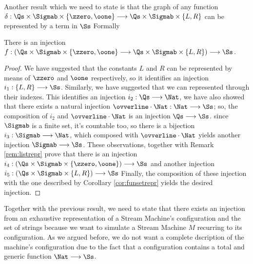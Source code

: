 \begin{conditional}{\notappendix}
  Another result which we need to state is that the graph of any function
  $\delta:\Qs \times \Sigmab \times
  \{\zzero, \oone\} \longrightarrow \Qs
  \times \Sigmab \times \{L,R\}$
  can be represented by a term in $\Ss$ Formally

  \begin{cor}
    \label{cor:deltarepr}
    There is an injection $f: (\Qs \times \Sigmab \times
    \{\zzero, \oone\} \longrightarrow \Qs
    \times \Sigmab \times \{L,R\}) \longrightarrow \Ss$.
  \end{cor}
  \begin{proof}
    We have suggested that the constants $L$ and $R$ can be represented by means of
    $\zzero$ and $\oone$ respectively, so it identifies an injection
    $i_1:\{L, R\} \longrightarrow \Ss$.
    Similarly, we have suggested that we can represented through their indexes.
    This identifies an injection $i_2: \Qs \longrightarrow \Nat$,
    we have also showed that there exists a natural injection
    $\ovverline \cdot \Nat:\Nat \longrightarrow \Ss$; so, the composition of
    $i_2$ and $\ovverline \cdot \Nat$ is an injection $\Qs\longrightarrow \Ss$.
    since $\Sigmab$ is a finite set, it's countable too, so there is a bijection
    $i_3: \Sigmab \longrightarrow \Nat$, which composed with $\ovverline \cdot \Nat$
    yields another injection $\Sigmab \longrightarrow \Ss$.
    These observations, together with Remark \ref{rem:listrepr} prove that
    there is an injection
    $i_4:\left(\Qs \times \Sigmab \times \{\zzero, \oone\}\right) \longrightarrow \Ss$
    and another injection
    $i_5:\left(\Qs \times \Sigmab \times \{L, R\}\right) \longrightarrow \Ss$
    Finally, the composition of these injection with the one described by
    Corollary \ref{cor:funsetrepr} yields the desired injection.
  \end{proof}

  Together with the previous result, we need to state
  that there exists an injection
  from an exhaustive representation of a Stream Machine's
  configuration and the set of strings because we want to simulate a
  Stream Machine $M$ recurring to its configuration. As we argued before,
  we do not want a complete dscription of the machine's configuration
  due to the fact that a configuration contains
  a total and generic function $\Nat \longrightarrow \Ss$.



\end{conditional}

